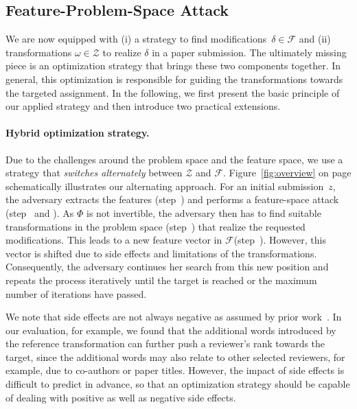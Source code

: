 \documentclass[letterpaper,twocolumn,10pt]{article}
\newcommand{\stepone}{\ding{182}\xspace}
\newcommand{\steptwo}{\ding{183}\xspace}
\newcommand{\stepthree}{\ding{184}\xspace}
\newcommand{\stepfour}{\ding{185}\xspace}
\newcommand{\stepfive}{\ding{186}\xspace}
\newcommand{\extractor}{\Phi}
\newcommand{\modifications}{\delta}
\newcommand{\Dom}{\ensuremath{\mathcal{Z}}\xspace}
\newcommand{\F}{\ensuremath{\mathcal{F}}\xspace}
\newcommand{\inputpdf}{\ensuremath{z}\xspace}
\newcommand{\transformation}{\ensuremath{\omega}\xspace}
\begin{document}
\subsection{Feature-Problem-Space Attack}
\label{sec:feature-problem-space}

We are now equipped with (i) a strategy to find modifications~\mbox{$\modifications \in \F$} and (ii) transformations \mbox{$\transformation \in \Dom$} to realize $\modifications$ in a paper submission.
The ultimately missing piece is an optimization strategy that brings these two components together. In general, this optimization is responsible for guiding the transformations towards the targeted assignment. 
In the following, we first present the basic principle of our applied strategy and then introduce two practical extensions.

\paragraph{Hybrid optimization strategy.}
Due to the challenges around the problem space and the feature space, we use a strategy that \emph{switches alternately} between \Dom and \F.
Figure~\ref{fig:overview} on page \pageref{fig:overview} schematically illustrates our alternating approach. For an initial submission~\inputpdf, the adversary extracts the features (step~\stepone) and performs a feature-space attack (step~\steptwo and \stepthree). As $\extractor$ is not {invertible\EndAccSupp{}}, the adversary then has to find suitable transformations in the problem space (step~\stepfour) that realize the requested modifications. This leads to a new feature vector in \F (step~\stepfive). However, this vector is shifted due to side effects and limitations of the transformations. Consequently, the adversary continues her search from this new position and repeats the process iteratively until the target is reached or the maximum number of iterations have passed.

We note that side effects are not always negative as assumed by prior work~\cite{pierazzi-20-intriguing}. In our evaluation, for example, we found that the additional words introduced by the reference transformation can further push a reviewer's rank towards the target, since the additional words may also relate to other selected reviewers, for example, due to co-authors or paper titles. However, the impact of side effects is difficult to predict in advance, so that an optimization strategy should be capable of dealing with positive as well as negative side effects.
\end{document}
